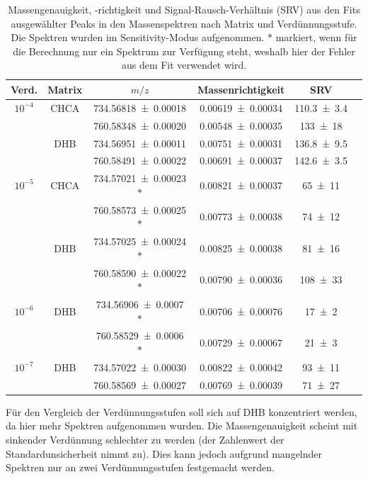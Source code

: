 \begin{table}[H]
	\centering
	\caption{Massengenauigkeit, -richtigkeit und Signal-Rausch-Verhältnis (SRV) aus den Fits ausgewählter Peaks in den Massenspektren nach Matrix und Verdünnungsstufe. Die Spektren wurden im Sensitivity-Modus aufgenommen. $*$ markiert, wenn für die Berechnung nur ein Spektrum zur Verfügung steht, weshalb hier der Fehler aus dem Fit verwendet wird.}
	   \begin{tabular}{c | c | c | c  | c | c}
      Verd. & Matrix & $m/z$ & Massenrichtigkeit & SRV \\ \hline
      $10^{-4}$ & CHCA & \SI{734,56818 \pm 0,00018}{} & \SI{0,00619 \pm 0,00034}{} & \SI{110,3 \pm 3,4}{}\\
                &      & \SI{760,58348 \pm 0,00020}{} & \SI{0,00548 \pm 0,00035}{} & \SI{133 \pm 18}{}\\
                & DHB  & \SI{734,56951 \pm 0,00011}{} & \SI{0,00751 \pm 0,00031}{} & \SI{136,8 \pm 9,5}{}\\
                &      & \SI{760,58491 \pm 0,00022}{} & \SI{0,00691 \pm 0,00037}{} & \SI{142,6 \pm 3,5}{}\\
      $10^{-5}$ & CHCA & \SI{734,57021 \pm 0,00023}{} $*$ & \SI{0,00821 \pm 0,00037}{} & \SI{65 \pm 11}{}\\
                &      & \SI{760,58573 \pm 0,00025}{} $*$ & \SI{0,00773 \pm 0,00038}{} & \SI{74 \pm 12}{} \\
                &  DHB & \SI{734,57025 \pm 0,00024}{} $*$ & \SI{0,00825 \pm 0,00038}{} & \SI{81 \pm 16}{}\\
                &      & \SI{760,58590 \pm 0,00022}{} $*$ & \SI{0,00790 \pm 0,00036}{} & \SI{108 \pm 33}{}\\
      $10^{-6}$ & DHB  & \SI{734,56906 \pm 0,0007 }{} $*$ & \SI{0,00706 \pm 0,00076}{} & \SI{17 \pm 2}{}\\
                &      & \SI{760,58529 \pm 0,0006 }{} $*$ & \SI{0,00729 \pm 0,00067}{} & \SI{21 \pm 3}{}\\
      $10^{-7}$ & DHB  & \SI{734,57022 \pm 0,00030}{} & \SI{0,00822 \pm 0,00042}{} & \SI{93 \pm 11}{}\\
                &      & \SI{760,58569 \pm 0,00027}{} & \SI{0,00769 \pm 0,00039}{} & \SI{71 \pm 27}{}\\
	\end{tabular}
	\label{tab:verduennungen}
\end{table}

Für den Vergleich der Verdünnungsstufen soll sich auf DHB konzentriert werden, da hier mehr Spektren aufgenommen wurden.
Die Massengenauigkeit scheint mit sinkender Verdünnung schlechter zu werden (der Zahlenwert der Standardunsicherheit nimmt zu).
Dies kann jedoch aufgrund mangelnder Spektren nur an zwei Verdünnungsstufen festgemacht werden.

